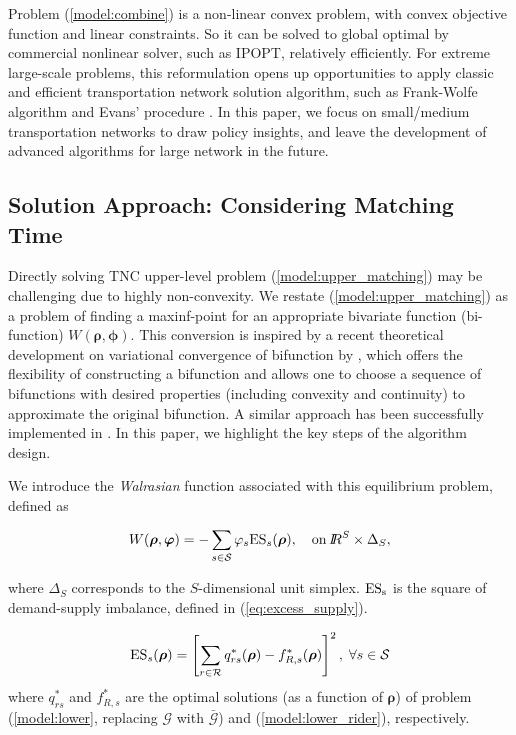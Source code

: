 \documentclass[review]{elsarticle}
\begin{document}
Problem (\ref{model:combine}) is a non-linear convex problem, with convex objective function and linear constraints. So it can be solved to global optimal by commercial nonlinear solver, such as IPOPT, relatively efficiently. For extreme large-scale problems, this reformulation opens up opportunities to apply classic and efficient transportation network solution algorithm, such as Frank-Wolfe algorithm \citep{Sheffi_85} and Evans' procedure \citep{evans1976derivation}. In this paper, we focus on small/medium transportation networks to draw policy insights, and leave the development of advanced algorithms for large network in the future.

\subsection{Solution Approach: Considering Matching Time}

Directly solving TNC upper-level problem (\ref{model:upper_matching}) may be challenging due to highly non-convexity. We restate (\ref{model:upper_matching}) as a problem of finding a maxinf-point for an appropriate bivariate function (bi-function) $W(\bm{\rho},\bm{\phi})$. This conversion is inspired by a recent theoretical development on variational convergence of bifunction by \cite{jw_09}, which offers the flexibility of constructing a bifunction and allows one to choose a sequence of bifunctions with desired properties (including convexity and continuity) to approximate the original bifunction.  A similar approach has been successfully implemented in \citep{Guo_et_al_16, deride2019solving}. In this paper, we highlight the key steps of the algorithm design.

We introduce the \emph{Walrasian} 
function associated with this equilibrium problem, defined as

\[W(\bm{\rho},\bm{\varphi})=-\sum_{s\in \mathcal{S}} \varphi_s{\rm ES}_s(\bm{\rho}),\quad {\rm on }\, {I\kern-.35em R}^S\times\Delta_S,\]

\noindent where $\Delta_S$ corresponds to the $S$-dimensional unit simplex. $\rm{ES_s}$ is the square of demand-supply imbalance, defined in (\ref{eq:excess_supply}).

\begin{equation}
{\rm ES}_s(\bm{\rho}) = \left[\sum_{r \in \mathcal{R}}q_{rs}^{\ast}(\bm{\rho}) - f_{R,s}^{\ast}(\bm{\rho})\right ]^2, \; \forall s \in \mathcal{S}
\label{eq:excess_supply}
\end{equation}
where $q_{rs}^{\ast}$ and $f_{R,s}^{\ast}$ are the optimal solutions (as a function of $\bm{\rho}$) of problem (\ref{model:lower}, replacing $\mathcal{G}$ with $\bar{\mathcal{G}}$) and (\ref{model:lower_rider}), respectively. 
\end{document}
